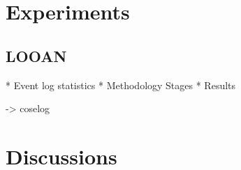 \section{Experiments}
\label{sec:experiments}


\subsection{LOOAN}
\label{subsec:xx}
* Event log statistics
* Methodology Stages
* Results

-> coselog

\section{Discussions}
\label{sec:discussions}